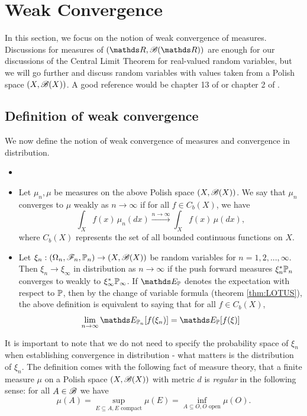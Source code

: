 \section{Weak Convergence}
In this section, we focus on the notion of weak convergence of measures. Discussions for measures of $(\R,\B(\R))$ are enough for our discussions of the Central Limit Theorem for real-valued random variables, but we will go further and discuss random variables with values taken from a Polish space $(X,\mathcal{B}(X))$. A good reference would be chapter 13 of \cite{AchimProbability} or chapter 2 of \cite{MeasuresMetric}. \\

\subsection{Definition of weak convergence}
We now define the notion of weak convergence of measures and convergence in distribution.

\begin{definition} 
\begin{itemize}
\item[]
\item Let $\mu_n, \mu$ be measures on the above Polish space $(X,\mathcal{B}(X))$. We say that $\mu_n$ converges to $\mu$ weakly as $n \to \infty$ if for all $f \in C_b(X)$, we have
\begin{equation*}
    \int_X f(x) \, \mu_n(dx) \overset{n \to \infty}{\to} \int_X f(x) \, \mu(dx),
\end{equation*}
where $C_b(X)$ represents the set of all bounded continuous functions on $X$.
\item Let $\xi_n : (\Omega_n, \mathcal{F}_n, \mathbb{P}_n) \to (X,\mathcal{B}(X))$ be random variables for $n = 1,2,...,\infty$. Then $\xi_n \to \xi_\infty$ in distribution as $n \to \infty$ if the push forward measures $\xi_n^* \mathbb{P}_n$ converges to weakly to $\xi_\infty^*\mathbb{P}_\infty$. If $\E_\p$ denotes the expectation with respect to $\mathbb{P}$, then by the change of variable formula (theorem \ref{thm:LOTUS}), the above definition is equivalent to saying that for all $f \in C_b(X)$,
\begin{equation*}
    \lim_{n\to\infty} \E_{\p_n}[f(\xi_n)] = \E_{\p}[f(\xi)]
\end{equation*}
\end{itemize}
\end{definition}

It is important to note that we do not need to specify the probability space of $\xi_n$ when establishing convergence in distribution - what matters is the distribution of $\xi_n$. The definition comes with the following fact of measure theory, that a finite measure $\mu$ on a Polish space $(X,\mathcal{B}(X))$ with metric $d$ is \textit{regular} in the following sense: for all $A \in \mathcal{B}$ we have
\begin{equation}
\mu(A) = \sup_{E \subseteq A, E \text{ compact}} \mu(E) = \inf_{A \subseteq O, O \text{ open}} \mu(O).
\end{equation}

